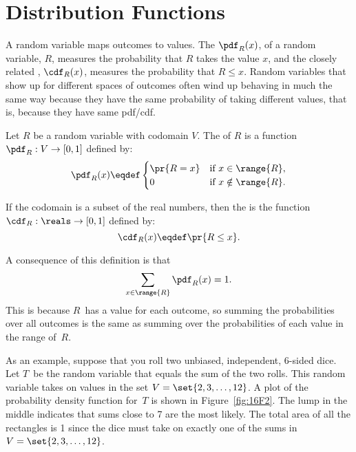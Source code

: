 \begin{problems}

\practiceproblems
{}

\homeworkproblems
{}

\end{problems}


\section{Distribution Functions}\label{distributions_sec}

A random variable maps outcomes to values.  The  $\pdf_R(x)$, of a random variable, $R$, measures
the probability that $R$ takes the value $x$, and the closely related
, $\cdf_R(x)$, measures the
probability that $R \leq x$.  Random variables that show up for
different spaces of outcomes often wind up behaving in much the same
way because they have the same probability of taking different values,
that is, because they have same pdf/cdf.

\begin{definition}
Let $R$ be a random variable with codomain $V$.
The  of $R$
is a function $\pdf_R : V \to [0,1]$ defined by:
%
\[
\pdf_R(x) \eqdef \begin{cases}
            \pr{R = x} & \text{if } x \in \range{R},\\
             0 & \text{if } x \notin \range{R}.
           \end{cases}
\]

If the codomain is a subset of the real numbers, then the  is the function $\cdf_R : \reals \to [0,1]$ defined by:
%
\[
\cdf_R(x) \eqdef \pr{R \leq x}.
\]
\end{definition}
%
A consequence of this definition is that
%
\[
\sum_{x \in \range{R}} \pdf_R(x) = 1.
\]
This is because $R$~has a value for each outcome, so summing the
probabilities over all outcomes is the same as summing over the
probabilities of each value in the range of~$R$.

As an example, suppose that you roll two unbiased, independent,
6-sided dice.  Let $T$~be the random variable that equals the sum of
the two rolls.  This random variable takes on values in the set $V =
\set{2, 3, \dots, 12}$.  A plot of the probability density function
for~$T$ is shown in Figure~\ref{fig:16F2}.  The lump in the middle
indicates that sums close to 7 are the most likely.  The total area of
all the rectangles is 1 since the dice must take on exactly one of the
sums in $V = \set{2, 3, \dots, 12}$.

